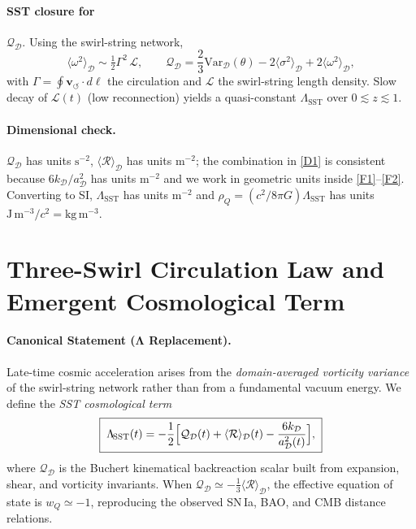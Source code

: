 \documentclass[10pt,reprint,aps,onecolumn,nofootinbib]{revtex4-2}
\newcommand{\vswirl}{\mathbf{v}_{\!\boldsymbol{\circlearrowleft}}}
\begin{document}
    \paragraph{SST closure for }\(\mathcal{Q}_\mathcal{D}\).
        Using the swirl-string network,
        \[
            \langle \omega^2 \rangle_\mathcal{D} \sim \tfrac{1}{2}\Gamma^{2}\,\mathcal{L},\qquad
            \mathcal{Q}_\mathcal{D}=\frac{2}{3}\mathrm{Var}_\mathcal{D}(\theta)
            -2\langle \sigma^2\rangle_\mathcal{D}+2\langle \omega^2\rangle_\mathcal{D},
        \]
        with $\Gamma=\oint \vswirl\!\cdot d\boldsymbol{\ell}$ the circulation and
        $\mathcal{L}$ the swirl-string length density. Slow decay of $\mathcal{L}(t)$ (low reconnection) yields a quasi-constant $\Lambda_{\!\mathrm{SST}}$ over $0\lesssim z\lesssim 1$.
    \paragraph{Dimensional check.}
        $\mathcal{Q}_\mathcal{D}$ has units $\mathrm{s^{-2}}$, $\langle \mathcal{R}\rangle_\mathcal{D}$ has units $\mathrm{m^{-2}}$; the combination in \eqref{D1} is consistent because $6k_\mathcal{D}/a_\mathcal{D}^2$ has units $\mathrm{m^{-2}}$ and we work in geometric units inside \eqref{F1}–\eqref{F2}. Converting to SI, $\Lambda_{\!\mathrm{SST}}$ has units $\mathrm{m^{-2}}$ and $\rho_Q=(c^{2}/8\pi G)\Lambda_{\!\mathrm{SST}}$ has units $\mathrm{J\,m^{-3}}/c^{2}=\mathrm{kg\,m^{-3}}$.


    \section{Three-Swirl Circulation Law and Emergent Cosmological Term}
    \label{sec:SST-three-swirl-Lambda}

    \paragraph{Canonical Statement (Λ Replacement).}
        Late-time cosmic acceleration arises from the \emph{domain-averaged vorticity variance}
        of the swirl-string network rather than from a fundamental vacuum energy. We define
        the \emph{SST cosmological term}
        \begin{equation}
            \boxed{\;
            \Lambda_{\!\mathrm{SST}}(t)=
                -\frac{1}{2}\Bigl[\mathcal{Q}_\mathcal{D}(t)+\langle\mathcal{R}\rangle_\mathcal{D}(t)
                -\frac{6k_\mathcal{D}}{a_\mathcal{D}^{2}(t)}\Bigr],
                \;}
            \label{eq:SST-Lambda}
        \end{equation}
        where $\mathcal{Q}_\mathcal{D}$ is the Buchert kinematical backreaction scalar
        \cite{Buchert2000,Buchert2001} built from expansion, shear, and vorticity invariants.
        When $\mathcal{Q}_\mathcal{D}\simeq -\tfrac13\langle\mathcal{R}\rangle_\mathcal{D}$,
        the effective equation of state is $w_Q\simeq-1$, reproducing the observed SN\,Ia,
        BAO, and CMB distance relations.
\end{document}
